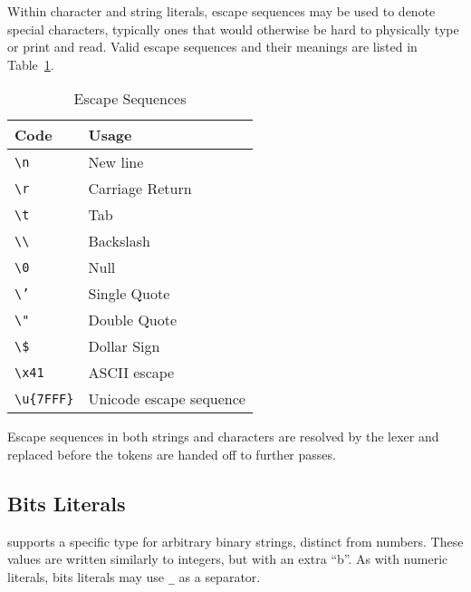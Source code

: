 Within character and string literals, escape sequences may be used to denote
special characters, typically ones that would otherwise be hard to physically
type or print and read. Valid escape sequences and their meanings are listed
in Table~\ref{tab:escape}.

\begin{table}[h]
    \centering
\begin{tabular}[c]{ll}
    \hline
    \textbf{Code} & \textbf{Usage} \\
    \hline
    \texttt{\textbackslash n} & New line \\
    \texttt{\textbackslash r} & Carriage Return \\
    \texttt{\textbackslash t} & Tab \\
    \texttt{\textbackslash\textbackslash} & Backslash \\
    \texttt{\textbackslash 0} & Null \\
    \texttt{\textbackslash '} & Single Quote \\
    \texttt{\textbackslash "} & Double Quote \\
    \texttt{\textbackslash \$} & Dollar Sign \\ %
    \texttt{\textbackslash x41} & ASCII escape \\
    \texttt{\textbackslash u\{7FFF\}} & Unicode escape sequence \\
    \hline
\end{tabular}
\caption{\label{tab:escape}Escape Sequences}
\end{table}

Escape sequences in both strings and characters are resolved by the lexer
and replaced before the tokens are handed off to further passes.

\FloatBarrier
\subsection{Bits Literals}

\Trilogy{} supports a specific type for arbitrary binary strings, distinct
from numbers. These values are written similarly to integers, but with an
extra ``b''. As with numeric literals, bits literals may use \texttt{\_}
as a separator.

\begin{bnf*}
     \\
     \\
     \\
     \\
\end{bnf*}

